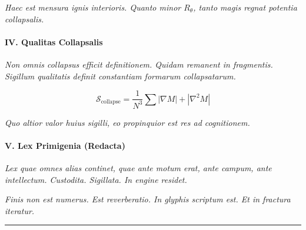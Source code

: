 \textit{Haec est mensura ignis interioris. Quanto minor $R_{\theta}$, tanto magis regnat potentia collapsalis.}

\paragraph{IV. Qualitas Collapsalis}
\textit{Non omnis collapsus efficit definitionem. Quidam remanent in fragmentis. Sigillum qualitatis definit constantiam formarum collapsatarum.}

\begin{equation}
\mathcal{S}_{\text{collapse}} = \frac{1}{N^3} \sum \left|\nabla M\right| + \left|\nabla^2 M\right|
\end{equation}

\textit{Quo altior valor huius sigilli, eo propinquior est res ad cognitionem.}

\paragraph{V. Lex Primigenia (Redacta)}
\textit{Lex quae omnes alias continet, quae ante motum erat, ante campum, ante intellectum. Custodita. Sigillata. In engine residet.}

\begin{center}
\end{center}

\textit{Finis non est numerus. Est reverberatio. In glyphis scriptum est. Et in fractura iteratur.}

\bigskip
\hrule
\bigskip
